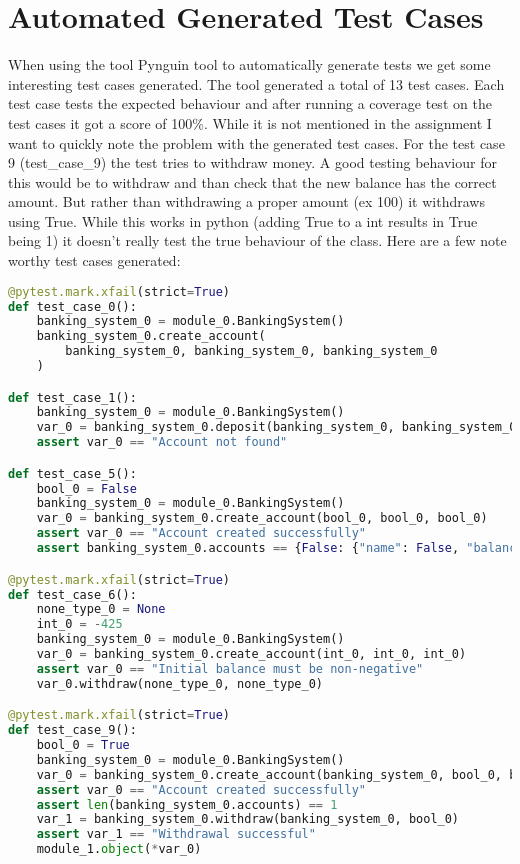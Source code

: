 \documentclass{article}
\begin{document}
\section{Automated Generated Test Cases}
When using the tool Pynguin tool to automatically generate tests we get some interesting test cases generated. The tool generated a total of 13 test cases. Each test case tests the expected behaviour and after running a coverage test on the test cases it got a score of 100\%. While it is not mentioned in the assignment I want to quickly note the problem with the generated test cases. For the test case 9 (test\_case\_9) the test tries to withdraw money. A good testing behaviour for this would be to withdraw and than check that the new balance has the correct amount. But rather than withdrawing a proper amount (ex 100) it withdraws using True. While this works in python (adding True to a int results in True being 1) it doesn't really test the true behaviour of the class. Here are a few note worthy test cases generated: \\


\begin{lstlisting}[language=Python]
@pytest.mark.xfail(strict=True)
def test_case_0():
    banking_system_0 = module_0.BankingSystem()
    banking_system_0.create_account(
        banking_system_0, banking_system_0, banking_system_0
    )

def test_case_1():
    banking_system_0 = module_0.BankingSystem()
    var_0 = banking_system_0.deposit(banking_system_0, banking_system_0)
    assert var_0 == "Account not found"

def test_case_5():
    bool_0 = False
    banking_system_0 = module_0.BankingSystem()
    var_0 = banking_system_0.create_account(bool_0, bool_0, bool_0)
    assert var_0 == "Account created successfully"
    assert banking_system_0.accounts == {False: {"name": False, "balance": False}}

@pytest.mark.xfail(strict=True)
def test_case_6():
    none_type_0 = None
    int_0 = -425
    banking_system_0 = module_0.BankingSystem()
    var_0 = banking_system_0.create_account(int_0, int_0, int_0)
    assert var_0 == "Initial balance must be non-negative"
    var_0.withdraw(none_type_0, none_type_0)

@pytest.mark.xfail(strict=True)
def test_case_9():
    bool_0 = True
    banking_system_0 = module_0.BankingSystem()
    var_0 = banking_system_0.create_account(banking_system_0, bool_0, bool_0)
    assert var_0 == "Account created successfully"
    assert len(banking_system_0.accounts) == 1
    var_1 = banking_system_0.withdraw(banking_system_0, bool_0)
    assert var_1 == "Withdrawal successful"
    module_1.object(*var_0)
\end{lstlisting}

\hspace{0cm}
\newpage



\end{document}
